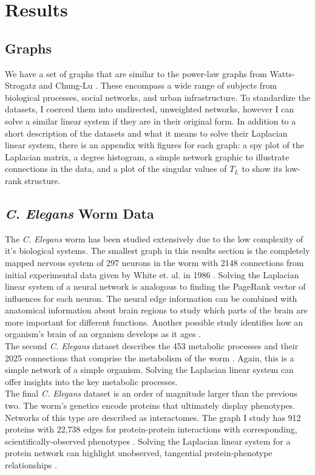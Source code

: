 \documentclass{article}
\begin{document}
\chapter{Results}
\section{Graphs}
We have a set of graphs that are similar to the power-law graphs from Watts-Strogatz and Chung-Lu \cite{Watts:1998,Chung:2004}. These encompass a wide range of subjects from biological processes, social networks, and urban infrastructure. To standardize the datasets, I coerced them into undirected, unweighted networks, however I can solve a similar linear system if they are in their original form. In addition to a short description of the datasets and what it means to solve their Laplacian linear system, there is an appendix with figures for each graph: a spy plot of the Laplacian matrix, a degree histogram, a simple network graphic to illustrate connections in the data, and a plot of the singular values of $T_L$ to show its low-rank structure.
\section{\textit{C. Elegans} Worm Data}
The \textit{C. Elegans} worm has been studied extensively due to the low complexity of it's biological systems. The smallest graph in this results section is the completely mapped nervous system of 297 neurons in the worm with 2148 connections from initial experimental data given by White et. al. in 1986 \cite{White:1986,Watts:1998}. Solving the Laplacian linear system of a neural network is analogous to finding the PageRank vector of  influences for each neuron. The neural edge information can be combined with anatomical information about brain regions to study which parts of the brain are more important for different functions. Another possible study identifies how an organism's brain of an organism develops as it ages \cite{Gleich:2015}.\\

The second \textit{C. Elegans} dataset describes the 453 metabolic processes and their 2025 connections that comprise the metabolism of the worm \cite{Duch:2005}. Again, this is a simple network of a simple organism. Solving the Laplacian linear system can offer insights into the key metabolic processes.\\

The final \textit{C. Elegans} dataset is an order of magnitude larger than the previous two. The worm's genetics encode proteins that ultimately display phenotypes. Networks of this type are described as interactomes. The graph I study has 912 proteins with 22,738 edges for protein-protein interactions with corresponding, scientifically-observed phenotypes \cite{Simonis:2009}. Solving the Laplacian linear system for a protein network can highlight unobserved, tangential protein-phenotype relationships \cite{Gleich:2015}.\\
\end{document}
